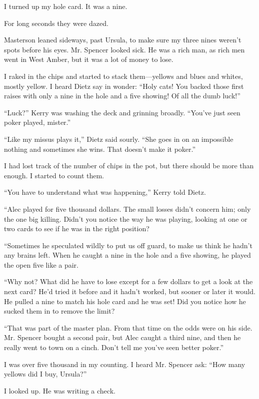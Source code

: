 \documentclass{novel}
\begin{document}
I turned up my hole card. It was a nine.

\scenestars

For long seconds they were dazed.

Masterson leaned sideways, past Ursula, to make sure my three nines weren’t spots before his eyes. Mr. Spencer looked sick. He was a rich man, as rich men went in West Amber, but it was a lot of money to lose.

I raked in the chips and started to stack them—yellows and blues and whites, mostly yellow. I heard Dietz say in wonder: “Holy cats! You backed those first raises with only a nine in the hole and a five showing! Of all the dumb luck!”

“Luck?” Kerry was washing the deck and grinning broadly. “You’ve just seen poker played, mister.”

“Like my missus plays it,” Dietz said sourly. “She goes in on an impossible nothing and sometimes she wins. That doesn’t make it poker.”

I had lost track of the number of chips in the pot, but there should be more than enough. I started to count them.

“You have to understand what was happening,” Kerry told Dietz. 

“Alec played for five thousand dollars. The small losses didn’t concern him; only the one big killing. Didn’t you notice the way he was playing, looking at one or two cards to see if he was in the right position? 

“Sometimes he speculated wildly to put us off guard, to make us think he hadn’t any brains left. When he caught a nine in the hole and a five showing, he played the open five like a pair. 

“Why not? What did he have to lose except for a few dollars to get a look at the next card? He’d tried it before and it hadn’t worked, but sooner or later it would. He pulled a nine to match his hole card and he was set! Did you notice how he sucked them in to remove the limit? 

“That was part of the master plan. From that time on the odds were on his side. Mr. Spencer bought a second pair, but Alec caught a third nine, and then he really went to town on a cinch. Don’t tell me you’ve seen better poker.”

I was over five thousand in my counting. I heard Mr. Spencer ask: “How many yellows did I buy, Ursula?”

I looked up. He was writing a check.
\end{document}
